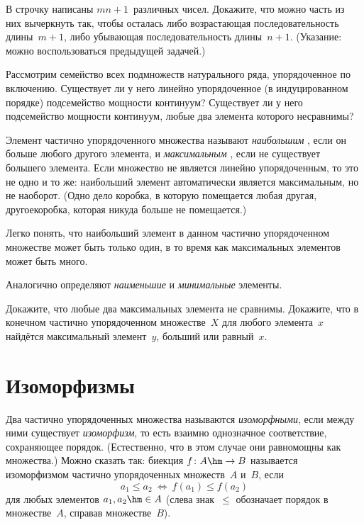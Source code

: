 \begin{problem}
В строчку написаны $mn+1$~различных чисел. Докажите, что можно
часть из них вычеркнуть так, чтобы осталась либо возрастающая
последовательность длины~$m+1$, либо убывающая
последовательность длины~$n+1$. (Указание: можно воспользоваться
предыдущей задачей.)
\end{problem}

\begin{problem}
Рассмотрим семейство всех подмножеств натурального ряда,
упорядоченное по включению. Существует ли у него
линейно упорядоченное (в индуцированном порядке) подсемейство
мощности континуум? Существует ли у него подсемейство
мощности континуум, любые два элемента которого несравнимы?
\end{problem}

Элемент частично упорядоченного множества называют \emph{наибольшим}%
,
если он больше
любого другого элемента, и \emph{максимальным}%
,
если не существует большего элемента. Если множество не
является линейно упорядоченным, то это не одно и то же:
наибольший элемент
автоматически является максимальным,
но не наоборот. (Одно дело коробка, в которую помещается
любая другая, другое\т коробка, которая никуда больше
не помещается.)

Легко понять, что наибольший элемент в данном частично
упорядоченном множестве может быть только один, в
то время как максимальных элементов может быть много.

Аналогично определяют \emph{наименьшие}
 и \emph{минимальные} элементы.

\begin{problem}
Докажите, что любые два максимальных элемента
не сравнимы. Докажите, что в конечном частично
упорядоченном множестве~$X$ для любого элемента~$x$
найдётся максимальный элемент~$y$, больший или равный~$x$.
\end{problem}

\section{Изоморфизмы}
        \label{isomorphisms}%

Два частично упорядоченных множества называются
\emph{изоморфными}, если между ними существует
\emph{изоморфизм}, то есть взаимно однозначное соответствие,
сохраняющее порядок. (Естественно, что в этом случае
они равномощны как множества.) Можно сказать так:
биекция $f\colon A\hm\to B$ называется изоморфизмом частично
упорядоченных множеств~$A$ и~$B$, если
        $$
 a_1 \le a_2 \ \Leftrightarrow \ f(a_1) \le f(a_2)
        $$
для любых элементов $a_1,a_2\hm\in A$ (слева знак~$\le$ обозначает
порядок в множестве~$A$, справа\т в множестве~$B$).

